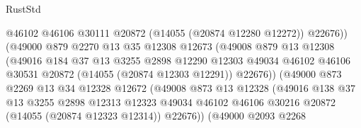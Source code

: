 \begin{lexlean}{RustStd}
\begin{coremodule}
                                  @46102
                                  @46106
                                  @30111
                                  @20872
                                  (@14055 (@20874 @12280 @12272))
                                  @22676))
                              (@49000
                                @879
                                @2270
                                @13
                                @35
                                @12308
                                @12673
                                (@49008
                                  @879
                                  @13
                                  @12308
                                  (@49016
                                    @184
                                    @37
                                    @13
                                    @3255
                                    @2898
                                    @12290
                                    @12303
                                    @49034
                                    @46102
                                    @46106
                                    @30531
                                    @20872
                                    (@14055 (@20874 @12303 @12291))
                                    @22676))
                                (@49000
                                  @873
                                  @2269
                                  @13
                                  @34
                                  @12328
                                  @12672
                                  (@49008
                                    @873
                                    @13
                                    @12328
                                    (@49016
                                      @138
                                      @37
                                      @13
                                      @3255
                                      @2898
                                      @12313
                                      @12323
                                      @49034
                                      @46102
                                      @46106
                                      @30216
                                      @20872
                                      (@14055 (@20874 @12323 @12314))
                                      @22676))
                                  (@49000
                                    @2093
                                    @2268

\end{coremodule}
\end{lexlean}
